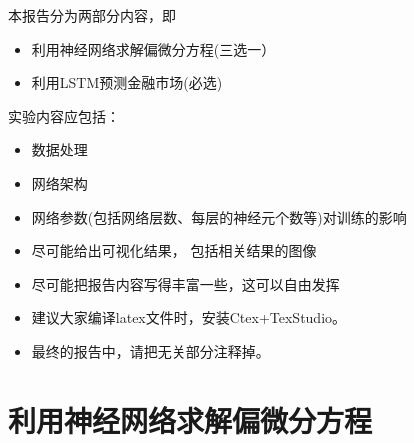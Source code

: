 \documentclass[addpoints,answers]{exam}
\begin{document}
\begin{center}
\end{center}

\vspace{5mm}

\begin{center}
  \hspace{5mm}
  \hspace{5mm}
\end{center}

\renewcommand{\solutiontitle}{\noindent\textbf{解:}\enspace}


\begin{remark}
	本报告分为两部分内容，即
	\begin{itemize}
		\item 利用神经网络求解偏微分方程(三选一）
		\item 利用LSTM预测金融市场(必选)
	\end{itemize}

实验内容应包括：
\begin{itemize}
	\item 数据处理 
	\item 网络架构
	\item 网络参数(包括网络层数、每层的神经元个数等)对训练的影响
	\item 尽可能给出可视化结果， 包括相关结果的图像
	\item 尽可能把报告内容写得丰富一些，这可以自由发挥
	\item 建议大家编译latex文件时，安装Ctex+TexStudio。
	\item 最终的报告中，请把无关部分注释掉。
\end{itemize}
\end{remark}

\section{利用神经网络求解偏微分方程}
  
\end{document}
